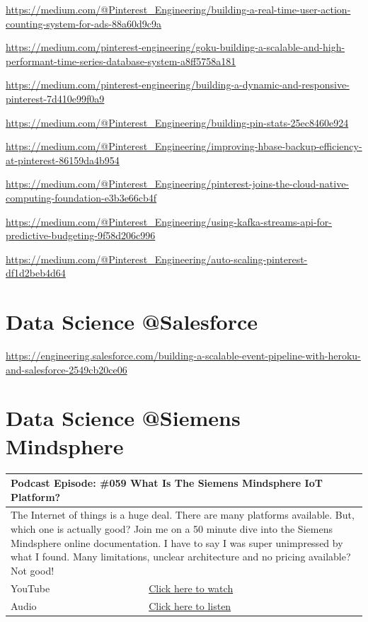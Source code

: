 \documentclass[12pt, numbers=noenddot]{scrreprt} %
\begin{document}
\url{https://medium.com/@Pinterest_Engineering/building-a-real-time-user-action-counting-system-for-ads-88a60d9c9a}

\url{https://medium.com/pinterest-engineering/goku-building-a-scalable-and-high-performant-time-series-database-system-a8ff5758a181}

\url{https://medium.com/pinterest-engineering/building-a-dynamic-and-responsive-pinterest-7d410e99f0a9}

\url{https://medium.com/@Pinterest_Engineering/building-pin-stats-25ec8460e924}

\url{https://medium.com/@Pinterest_Engineering/improving-hbase-backup-efficiency-at-pinterest-86159da4b954}

\url{https://medium.com/@Pinterest_Engineering/pinterest-joins-the-cloud-native-computing-foundation-e3b3e66cb4f}

\url{https://medium.com/@Pinterest_Engineering/using-kafka-streams-api-for-predictive-budgeting-9f58d206c996}

\url{https://medium.com/@Pinterest_Engineering/auto-scaling-pinterest-df1d2beb4d64}

\section{Data Science @Salesforce}
\url{https://engineering.salesforce.com/building-a-scalable-event-pipeline-with-heroku-and-salesforce-2549cb20ce06}

\section{Data Science @Siemens Mindsphere}

\begin{table}[h]
\begin{tabular}{ll}
\hline
\multicolumn{2}{l}{\textbf{Podcast Episode:} \#059 What Is The Siemens Mindsphere IoT Platform?} \\ \hline
\multicolumn{2}{p{15cm}}{The Internet of things is a huge deal. There are many platforms available. But, which one is actually good? Join me on a 50 minute dive into the Siemens Mindsphere online documentation.
 I have to say I was super unimpressed by what I found. 
Many limitations, unclear architecture and no pricing available? 
Not good!}         \\ \hline
\multicolumn{1}{l|}{YouTube}   & \href{https://youtu.be/HEd5Tsuy5HE}{Click here to watch}   \\ 
\multicolumn{1}{l|}{Audio}     & \href{https://anchor.fm/andreaskayy/episodes/059-A-Look-Into-The-Siemens-Mindsphere-IoT-Platform---059-e45ihn}{Click here to listen}   \\ \hline
\end{tabular}
\end{table}
\end{document}
